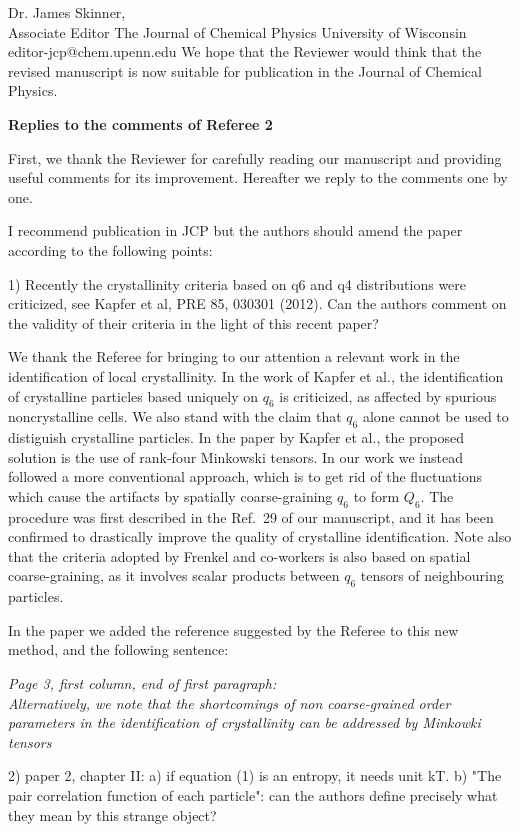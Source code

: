 \documentclass[a4paper, rebuttal, parskip=true, firsthead=false, fromemail=false, foldmarks=false]{scrlttr2}
\begin{document}
\begin{letter}{Dr. James Skinner,\\Associate Editor
The Journal of Chemical Physics
University of Wisconsin\\
editor-jcp@chem.upenn.edu }
We hope that the Reviewer would think that the revised manuscript is now suitable for publication in the Journal of Chemical Physics. 

\clearpage

\textsf{\textbf{Replies to the comments of Referee 2}}

First, we thank the Reviewer for carefully reading our manuscript and providing useful comments for its improvement. 
Hereafter we reply to the comments one by one.

\begin{quotationi}

I recommend publication in JCP but the authors should amend the paper
according to the following points:

1) Recently the crystallinity criteria based on q6 and q4 distributions
were criticized, see Kapfer et al, PRE 85, 030301 (2012). Can the authors
comment on the validity of their criteria in the light of this recent paper?
\end{quotationi}

We thank the Referee for bringing to our attention a relevant work in the identification of
local crystallinity. In the work of Kapfer et al., the identification of crystalline
particles based uniquely on $q_6$ is criticized, as affected by spurious noncrystalline cells.
We also stand with the claim that $q_6$ alone cannot be used to distiguish crystalline particles. In the
paper by Kapfer et al., the proposed solution is the use of rank-four Minkowski tensors. In our work
we instead followed a more conventional approach, which is to get rid of the fluctuations which
cause the artifacts by spatially coarse-graining $q_6$ to form $Q_6$. The procedure was first
described in the Ref.~29 of our manuscript, and it has been confirmed to drastically improve the
quality of crystalline identification. Note also that the criteria adopted by Frenkel and co-workers
is also based on spatial coarse-graining, as it involves scalar products between $q_6$ tensors of
neighbouring particles.

In the paper we added the reference suggested by the Referee to this new method, and the following sentence:

{\it Page 3, first column, end of first paragraph:\\
Alternatively, we note that the shortcomings of
non coarse-grained order parameters in the identification of crystallinity can be addressed by Minkowki tensors~\cite{kapfer2012jammed}
}


\begin{quotationi}
2) paper 2, chapter II: a) if equation (1) is an entropy, it needs unit kT.
b) "The pair correlation function of each particle": can the authors
define precisely what they mean by this strange object?
\end{quotationi}


\end{letter}
\end{document}
